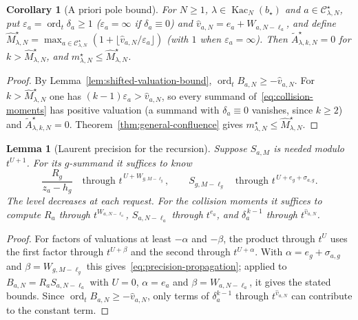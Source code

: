 \documentclass[twoside,10pt]{article}
\numberwithin{equation}{section}
\theoremstyle{slbody}
\newtheorem{lemma}[theorem]{Lemma}
\newtheorem{corollary}[theorem]{Corollary}
\theoremstyle{definition}
\theoremstyle{remark}
\newcommand{\ord}{\operatorname{ord}}
\begin{document}
\begin{corollary}[A priori pole bound]\label{cor:pole-bound}
For \(N\geq1\), \(\lambda\in\operatorname{Kac}_N(b_\star)\) and
\(a\in{\mathcal C}^{\star}_{\lambda,N}\), put
\(\varepsilon_a=\ord_t\delta_a\geq1\) (\(\varepsilon_a=\infty\) if
\(\delta_a\equiv0\)) and \(\widehat v_{a,N}=e_a+W_{a,N-\ell_a}\), and
define \(\widehat M^{\star}_{\lambda,N}=\max_{a\in{\mathcal C}^{\star}_{\lambda,N}}
(1+\lfloor\widehat v_{a,N}/\varepsilon_a\rfloor)\) (with \(1\) when
\(\varepsilon_a=\infty\)).  Then \(\widetilde A^{\star}_{\lambda,k,N}=0\) for
\(k>\widehat M^{\star}_{\lambda,N}\), and
\(m^{\star}_{\lambda,N}\leq\widehat M^{\star}_{\lambda,N}\).
\end{corollary}

\begin{proof}
By Lemma~\ref{lem:shifted-valuation-bound},
\(\ord_tB_{a,N}\geq-\widehat v_{a,N}\).  For
\(k>\widehat M^{\star}_{\lambda,N}\) one has
\((k-1)\varepsilon_a>\widehat v_{a,N}\), so every summand
of~\eqref{eq:collision-moments} has positive valuation (a summand with
\(\delta_a\equiv0\) vanishes, since \(k\geq2\)) and
\(\widetilde A^{\star}_{\lambda,k,N}=0\).  Theorem~\ref{thm:general-confluence}
gives \(m^{\star}_{\lambda,N}\leq\widehat M^{\star}_{\lambda,N}\).
\end{proof}

\begin{lemma}[Laurent precision for the recursion]
\label{lem:precision-budget}
Suppose \(S_{a,M}\) is needed modulo \(t^{U+1}\).  For its \(g\)-summand it
suffices to know
\begin{equation}\label{eq:precision-propagation}
 \frac{R_g}{z_a-h_g}\quad\text{through }t^{\,U+W_{g,M-\ell_g}},
 \qquad
 S_{g,M-\ell_g}\quad\text{through }t^{\,U+e_g+\sigma_{a,g}}.
\end{equation}
The level decreases at each request. For the collision moments it suffices to compute
\(R_a\) through \(t^{W_{a,N-\ell_a}}\), \(S_{a,N-\ell_a}\) through \(t^{e_a}\),
and \(\delta_a^{\,k-1}\) through \(t^{\widehat v_{a,N}}\).
\end{lemma}

\begin{proof}
For factors of valuations at least \(-\alpha\) and \(-\beta\), the product
through \(t^U\) uses the first factor through \(t^{U+\beta}\) and the second
through \(t^{U+\alpha}\).  With \(\alpha=e_g+\sigma_{a,g}\) and
\(\beta=W_{g,M-\ell_g}\) this gives~\eqref{eq:precision-propagation}; applied to
\(B_{a,N}=R_aS_{a,N-\ell_a}\) with \(U=0\), \(\alpha=e_a\) and
\(\beta=W_{a,N-\ell_a}\), it gives the stated bounds.  Since
\(\ord_tB_{a,N}\geq-\widehat v_{a,N}\), only terms of \(\delta_a^{k-1}\) through
\(t^{\widehat v_{a,N}}\) can contribute to the constant term.
\end{proof}
\end{document}
